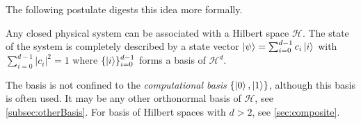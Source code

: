 		The following postulate digests this idea more formally.

		\begin{postulate}
			Any closed physical system can be associated with a Hilbert space \(\mathcal{H}\). The state of the system is completely described by a state vector \( \ket{\psi} = \sum_{i = 0}^{d - 1} c_i \ket{i} \) with \( \sum_{i = 0}^{d - 1} \lvert c_i \rvert^2 = 1 \) where \( \{ \ket{i} \}_{i = 0}^{d - 1} \) forms a basis of \( \mathcal{H}^d \).
		\end{postulate}
		\begin{remark}
			The basis is not confined to the \emph{computational basis} \( \{ \ket{0}, \ket{1} \} \), although this basis is often used. It may be any other orthonormal basis of \(\mathcal{H}\), see \autoref{subsec:otherBasis}. For basis of Hilbert spaces with \(d > 2\), see \autoref{sec:composite}.
		\end{remark}

